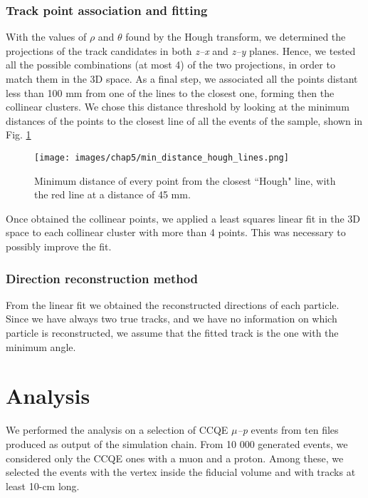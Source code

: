 \subsubsection{Track point association and fitting}
With the values of $\rho$ and $\theta$ found by the Hough transform, we determined the projections of the track candidates in both \textit{z--x} and \textit{z--y} planes. Hence, we tested all the possible combinations (at most 4) of the two projections, in order to match them in the 3D space. As a final step, we associated all the \lpc points distant less than 100 mm from one of the lines to the closest one, forming then the collinear clusters. We chose this distance threshold by looking at the minimum distances of the \lpc points to the closest line of all the events of the sample, shown in Fig. \ref{fig:min-dist-hough-lines} 

\begin{figure}[h!]
    \centering
    \texttt{[image: images/chap5/min\_distance\_hough\_lines.png]}
    \caption{Minimum distance of every \lpc point from the closest ``Hough" line, with the red line at a distance of 45 mm.}
    \label{fig:min-dist-hough-lines}
\end{figure}

Once obtained the collinear \lpc points, we applied a least squares linear fit in the 3D space to each collinear cluster with more than 4 \lpc points. This was necessary to possibly improve the fit. 

\subsubsection{Direction reconstruction method}
From the linear fit we obtained the reconstructed directions of each particle. Since we have always two true tracks, and we have no information on which particle is reconstructed, we assume that the fitted track is the one with the minimum angle.

\section{Analysis}
We performed the analysis on a selection of CCQE \textit{$\mu$--p} events from ten files produced as output of the simulation chain. From 10 000 generated events, we considered only the CCQE ones with a muon and a proton. Among these, we selected the events with the vertex inside the fiducial volume and with tracks at least 10-cm long. 

